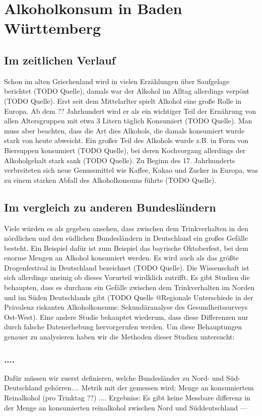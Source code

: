 \documentclass{article}
\begin{document}
\section{Alkoholkonsum in Baden Württemberg}



\subsection{Im zeitlichen Verlauf}
Schon im alten Griechenland wird in vielen Erzählungen über Saufgelage berichtet (TODO Quelle), damals war der Alkohol im Alltag allerdings verpönt (TODO Quelle). Erst seit dem Mittelarlter spielt Alkohol eine große Rolle in Europa. Ab dem ?? Jahrhundert wird er als ein wichtiger Teil der Ernährung von allen Altersgruppen mit etwa 3 Litern täglich Konsumiert (TODO Quelle). Man muss aber beachten, dass die Art dies Alkohols, die damals konsumiert wurde stark von heute abweicht. Ein großer Teil des Alkohols wurde z.B. in Form von Biersuppen konsumiert (TODO Quelle), bei deren Kochvorgang allerdings der Alkoholgehalt stark sank (TODO Quelle). Zu Beginn des 17. Jahrhunderts verbreiteten sich neue Genussmittel wie Kaffee, Kakao und Zucker in Europa, was zu einem starken Abfall des Alkoholkonsums führte (TODO Quelle). 

\subsection{Im vergleich zu anderen Bundesländern}
Viele würden es als gegeben ansehen, dass zwischen dem Trinkverhalten in den nördlichen und den südlichen Bundesländern in Deutschland ein großes Gefälle besteht. Ein Beispiel dafür ist zum Beispiel das bayrische Oktoberfest, bei dem enorme Mengen an Alkohol konsumiert werden. Es wird auch als das größte Drogenfestival in Deutschland bezeichnet (TODO Quelle). Die Wissenschaft ist sich allerdings uneinig ob dieses Vorurteil wirdklich zutrifft. Es gibt Studien die behaupten, dass es durchaus ein Gefälle zwischen dem Trinkverhalten im Norden und im Süden Deutschlands gibt (TODO Quelle @Regionale Unterschiede in der Prävalenz riskanten Alkoholkonsums: Sekundäranalyse des Gesundheitssurveys Ost-West). Eine andere Studie behauptet wiederum, dass diese Differenzen nur durch falsche Datenerhebung hervorgerufen werden. Um diese Behauptungen genauer zu analysieren haben wir die Methoden dieser Studien untersucht: 
\subsubsection {....}
Dafür müssen wir zuerst definieren, welche Bundesländer zu Nord- und Süd- Deutschland gehörren.... 
Metrik mit der gemessen wird: Menge an konsumiertem Reinalkohol (pro Trinktag ??)
....
Ergebniss: Es gibt keine Messbare differenz in der Menge an konsumierten reinalkohol zwischen Nord und Süddeutschland
---
\end{document}
